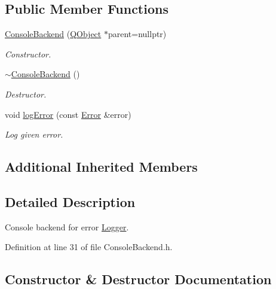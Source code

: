 \subsection*{Public Member Functions}
\begin{DoxyCompactItemize}
\item 
\hyperlink{class_mdt_1_1_error_logger_1_1_console_backend_a79446af5d7658fba5075131f2a0b10dd}{Console\+Backend} (\hyperlink{class_q_object}{Q\+Object} $\ast$parent=nullptr)
\begin{DoxyCompactList}\small\item\em Constructor. \end{DoxyCompactList}\item 
\hyperlink{class_mdt_1_1_error_logger_1_1_console_backend_a7ac5878daa1e4204884d62c592de0e57}{$\sim$\+Console\+Backend} ()
\begin{DoxyCompactList}\small\item\em Destructor. \end{DoxyCompactList}\item 
void \hyperlink{class_mdt_1_1_error_logger_1_1_console_backend_a2d30700dd6a91c244d68bd3670fdbc33}{log\+Error} (const \hyperlink{class_mdt_1_1_error}{Error} \&error)
\begin{DoxyCompactList}\small\item\em Log given error. \end{DoxyCompactList}\end{DoxyCompactItemize}
\subsection*{Additional Inherited Members}


\subsection{Detailed Description}
Console backend for error \hyperlink{class_mdt_1_1_error_logger_1_1_logger}{Logger}. 

Definition at line 31 of file Console\+Backend.\+h.



\subsection{Constructor \& Destructor Documentation}
